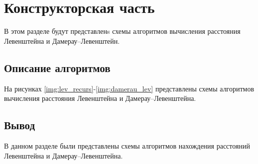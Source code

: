 \chapter{Конструкторская часть}
В этом разделе будут представленs схемы алгоритмов вычисления расстояния Левенштейна и Дамерау--Левенштейн.
\section{Описание алгоритмов}
На рисунках \ref{img:lev_recurs}-\ref{img:damerau_lev} представлены схемы алгоритмов вычисления расстояния Левенштейна и Дамерау--Левенштейна.

\clearpage

\clearpage

\clearpage

\clearpage

\clearpage




\section*{Вывод}

В данном разделе были представлены схемы алгоритмов нахождения расстояний Левенштейна и Дамерау--Левенштейна.

\clearpage
